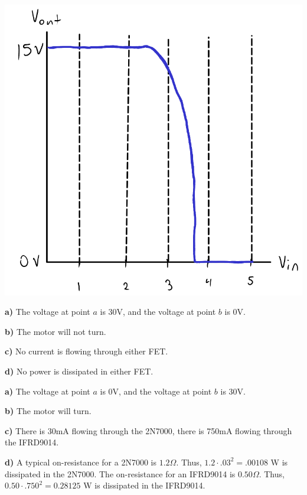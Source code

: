 \documentclass{article}
\begin{document}
    \begin{center}\includegraphics[scale=.5]{5.png}\end{center}

\newpage{}

    \textbf{a)} The voltage at point $a$ is 30V, and the voltage at point $b$ is 0V.
    
    \textbf{b)} The motor will not turn.
    
    \textbf{c)} No current is flowing through either FET.
    
    \textbf{d)} No power is dissipated in either FET.

\newpage{}

    \textbf{a)} The voltage at point $a$ is 0V, and the voltage at point $b$ is 30V.
    
    \textbf{b)} The motor will turn.

    \textbf{c)} There is 30mA flowing through the 2N7000, there is 750mA flowing through the IFRD9014.
    
    \textbf{d)} A typical on-resistance for a 2N7000 is $1.2\Omega$. Thus, $1.2 \cdot .03^2 = .00108$ W is dissipated in the 2N7000. The on-resistance for an IFRD9014 is $0.50 \Omega$. Thus, $0.50 \cdot .750^2 = 0.28125$ W is dissipated in the IFRD9014.

\newpage{}
\end{document}
